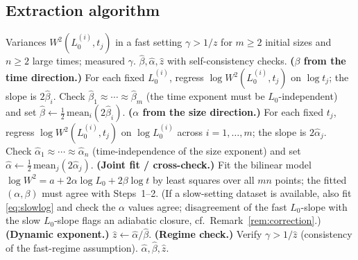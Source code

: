\documentclass{amsart}
\theoremstyle{definition}
\begin{document}
\subsection*{Extraction algorithm}

\begin{algorithm}[H]
\caption{Unambiguous extraction of $\alpha,\beta,z$ from the fast regime}
\begin{algorithmic}[1]
\Require Variances $W^2(L_0^{(i)},t_j)$ in a fast setting $\gamma>1/z$ for $m\ge2$
  initial sizes and $n\ge2$ large times; measured $\gamma$.
\Ensure $\hat\beta,\hat\alpha,\hat z$ with self-consistency checks.
\State \textbf{($\beta$ from the time direction.)} For each fixed $L_0^{(i)}$,
  regress $\log W^2(L_0^{(i)},t_j)$ on $\log t_j$; the slope is $2\hat\beta_i$.
  Check $\hat\beta_1\approx\cdots\approx\hat\beta_m$ (the time exponent must be
  $L_0$-independent) and set $\hat\beta\gets\tfrac12\,\mathrm{mean}_i(2\hat\beta_i)$.
\State \textbf{($\alpha$ from the size direction.)} For each fixed $t_j$, regress
  $\log W^2(L_0^{(i)},t_j)$ on $\log L_0^{(i)}$ across $i=1,\dots,m$; the slope is
  $2\hat\alpha_j$. Check $\hat\alpha_1\approx\cdots\approx\hat\alpha_n$
  (time-independence of the size exponent) and set
  $\hat\alpha\gets\tfrac12\,\mathrm{mean}_j(2\hat\alpha_j)$.
\State \textbf{(Joint fit / cross-check.)} Fit the bilinear model
  $\log W^2=a+2\alpha\log L_0+2\beta\log t$ by least squares over all $mn$ points;
  the fitted $(\alpha,\beta)$ must agree with Steps~1--2. (If a slow-setting dataset
  is available, also fit \eqref{eq:slowlog} and check the $\alpha$ values agree;
  disagreement of the fast $L_0$-slope with the slow $L_0$-slope flags an adiabatic
  closure, cf.\ Remark~\ref{rem:correction}.)
\State \textbf{(Dynamic exponent.)} $\hat z\gets\hat\alpha/\hat\beta$.
\State \textbf{(Regime check.)} Verify $\gamma>1/\hat z$ (consistency of the
  fast-regime assumption).
\State \Return $\hat\alpha,\hat\beta,\hat z$.
\end{algorithmic}
\end{algorithm}
\end{document}
